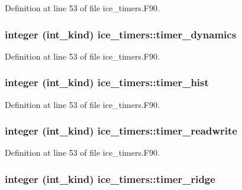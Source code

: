 Definition at line 53 of file ice\_\-timers.F90.\hypertarget{namespaceice__timers_ada6ea9e52bcd16e1d5ea869c9ef86e30}{
\subsubsection[{timer\_\-dynamics}]{\setlength{\rightskip}{0pt plus 5cm}integer (int\_\-kind) {\bf ice\_\-timers::timer\_\-dynamics}}}
\label{namespaceice__timers_ada6ea9e52bcd16e1d5ea869c9ef86e30}


Definition at line 53 of file ice\_\-timers.F90.\hypertarget{namespaceice__timers_a97b81f9ad9a98de0710a2f1859113352}{
\subsubsection[{timer\_\-hist}]{\setlength{\rightskip}{0pt plus 5cm}integer (int\_\-kind) {\bf ice\_\-timers::timer\_\-hist}}}
\label{namespaceice__timers_a97b81f9ad9a98de0710a2f1859113352}


Definition at line 53 of file ice\_\-timers.F90.\hypertarget{namespaceice__timers_af250a2fa78a031dcb6f923aa2afb2813}{
\subsubsection[{timer\_\-readwrite}]{\setlength{\rightskip}{0pt plus 5cm}integer (int\_\-kind) {\bf ice\_\-timers::timer\_\-readwrite}}}
\label{namespaceice__timers_af250a2fa78a031dcb6f923aa2afb2813}


Definition at line 53 of file ice\_\-timers.F90.\hypertarget{namespaceice__timers_a9005547a6ce9d2b619697fc3c7167df7}{
\subsubsection[{timer\_\-ridge}]{\setlength{\rightskip}{0pt plus 5cm}integer (int\_\-kind) {\bf ice\_\-timers::timer\_\-ridge}}}
\label{namespaceice__timers_a9005547a6ce9d2b619697fc3c7167df7}


